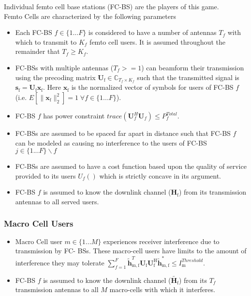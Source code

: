 \documentclass[12pt]{article}
\begin{document}
Individual femto cell base stations (FC-BS) are the players of this game.
\\
Femto Cells are characterized by the following parameters
\begin{itemize}
\item 
	Each FC-BS  $f \in \{1 ... F\}$ is considered to have a number of antennas $T_f$ with which to transmit to $K_f$ femto cell users. It is assumed throughout the remainder that $T_f \geq K_f$.
\\
\item 
	FC-BSs with multiple antennas ($T_f >=1$) can beamform their transmission using the precoding 	
	matrix $\mathbf{U}_{\mathrm{f}} \in \mathbb{C}_{T_f \times K_f}$ such that the transmitted 		
	signal is $\mathbf{s}_{\mathrm{f}
	}= \mathbf{U_{\mathrm{f}}}\mathbf{x_{\mathrm{f}}}$. Here $\mathbf{x_{\mathrm{f}}}$ is the 		
	normalized vector of symbols for users of FC-BS $f$ (i.e. $E[\|\mathbf{x}_{\mathrm{f}}
	\|_2^2]=1 \; \forall f \in \{1 ... F\}$).
\\
\item 
	FC-BS $f$ has power constraint $trace(\mathbf{U}_f^H\mathbf{U}_f) \leq P^{Total}_{f} $.
\\
\item
	 FC-BSs are assumed to be spaced far apart in distance such that FC-BS $f$ can be modeled as 
	 causing no interference to the users of FC-BS $j \in \{1 ... F\}\backslash f$
\item 
	FC-BSs are assumed to have a cost function  based upon the quality of service 		
	provided to its users $U_f()$ which is strictly concave in its argument.

\item 
	FC-BS $f$ is assumed to know the downlink channel ($\mathbf{H_\mathrm{f}}$) from its transmission 		
	antennas to all served users.
\\
\end{itemize}

\subsubsection{Macro Cell Users}

\begin{itemize}
\item 
	Macro Cell user $m \in \{1 ... M\}$ experiences receiver interference due to transmission by
	FC-	BSs. These macro-cell users have limits to the amount of interference they may tolerate 
	$\sum^F_{f=1} \mathbf{\tilde{h}}_{\mathrm{m,f}}^T  \mathbf{U_{\mathrm{f}}} 						
	\mathbf{U_{\mathrm{f}}^{\mathrm{H}}} \mathbf{\tilde{h}_{\mathrm{m,f}}^*} \leq I^{Threshold}		
	_{\mathrm{m}} $.

\item 
	FC-BS $f$ is assumed to know the downlink channel ($\tilde{\mathbf{H}_{\mathrm{f}}}$) from its $T_f$
	transmission antennas to all $M$ macro-cells with which it interferes.
\\
\end{itemize}
\end{document}
